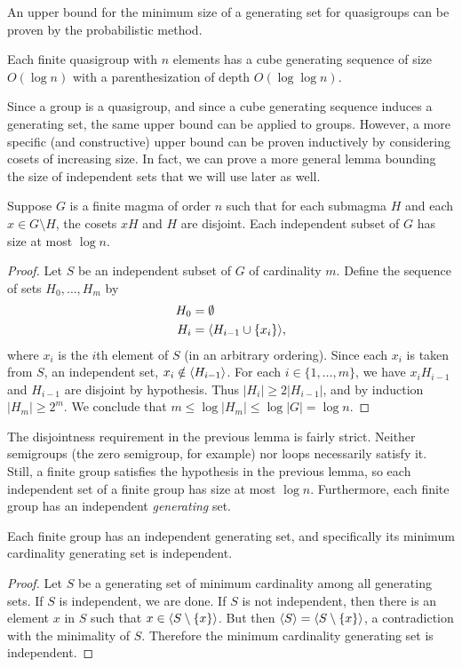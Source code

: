 An upper bound for the minimum size of a generating set for quasigroups can be proven by the probabilistic method.

\begin{lemma}\label{lem:small}
  Each finite quasigroup with $n$ elements has a cube generating sequence of size $O(\log n)$ with a parenthesization of depth $O(\log \log n)$.
\end{lemma}

Since a group is a quasigroup, and since a cube generating sequence induces a generating set, the same upper bound can be applied to groups.
However, a more specific (and constructive) upper bound can be proven inductively by considering cosets of increasing size.
In fact, we can prove a more general lemma bounding the size of independent sets that we will use later as well.

\begin{lemma}\label{lem:magind}
  Suppose $G$ is a finite magma of order $n$ such that for each submagma $H$ and each $x \in G \setminus H$, the cosets $xH$ and $H$ are disjoint.
  Each independent subset of $G$ has size at most $\log n$.
\end{lemma}
\begin{proof}
  Let $S$ be an independent subset of $G$ of cardinality $m$.
  Define the sequence of sets $H_0, \dotsc, H_m$ by
  \begin{align*}
    H_0 & = \emptyset \\
    H_i & = \langle H_{i - 1} \cup \{x_i\} \rangle,
  \end{align*}
  where $x_i$ is the $i$th element of $S$ (in an arbitrary ordering).
  Since each $x_i$ is taken from $S$, an independent set, $x_i \notin \langle H_{i - 1} \rangle$.
  For each $i \in \{1, \dotsc, m\}$, we have $x_i H_{i - 1}$ and $H_{i - 1}$ are disjoint by hypothesis.
  Thus $|H_i| \geq 2 |H_{i - 1}|$, and by induction $|H_m| \geq 2^m$.
  We conclude that $m \leq \log |H_m| \leq \log |G| = \log n$.
\end{proof}

The disjointness requirement in the previous lemma is fairly strict.
Neither semigroups (the zero semigroup, for example) nor loops necessarily satisfy it.
Still, a finite group satisfies the hypothesis in the previous lemma, so each independent set of a finite group has size at most $\log n$.
Furthermore, each finite group has an independent \emph{generating} set.

\begin{lemma}
  Each finite group has an independent generating set, and specifically its minimum cardinality generating set is independent.
\end{lemma}
\begin{proof}
  Let $S$ be a generating set of minimum cardinality among all generating sets.
  If $S$ is independent, we are done.
  If $S$ is not independent, then there is an element $x$ in $S$ such that $x \in \langle S \setminus \{x\} \rangle$.
  But then $\langle S \rangle = \langle S \setminus \{x\} \rangle$, a contradiction with the minimality of $S$.
  Therefore the minimum cardinality generating set is independent.
\end{proof}

